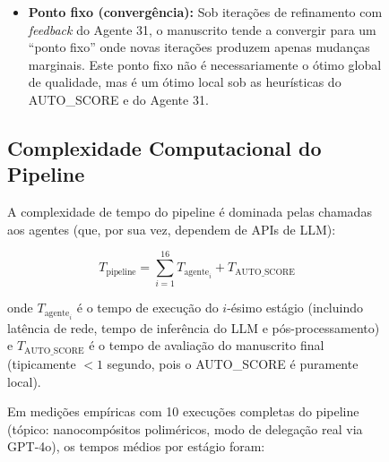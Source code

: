 \begin{figure}
\begin{itemize}
    \item \textbf{Ponto fixo (convergência):} Sob iterações de
    refinamento com \textit{feedback} do Agente 31, o manuscrito
    tende a convergir para um ``ponto fixo'' onde novas iterações
    produzem apenas mudanças marginais. Este ponto fixo não é
    necessariamente o ótimo global de qualidade, mas é um ótimo
    local sob as heurísticas do AUTO\_SCORE e do Agente 31.
\end{itemize}

\subsection{Complexidade Computacional do Pipeline}
\label{sec:complexidade}

A complexidade de tempo do pipeline é dominada pelas chamadas aos
agentes (que, por sua vez, dependem de APIs de LLM):

\begin{equation}
T_{\text{pipeline}} = \sum_{i=1}^{16} T_{\text{agente}_i} + T_{\text{AUTO\_SCORE}}
\label{eq:tempo}
\end{equation}

onde $T_{\text{agente}_i}$ é o tempo de execução do $i$-ésimo
estágio (incluindo latência de rede, tempo de inferência do LLM e
pós-processamento) e $T_{\text{AUTO\_SCORE}}$ é o tempo de
avaliação do manuscrito final (tipicamente $< 1$ segundo, pois o
AUTO\_SCORE é puramente local).

Em medições empíricas com 10 execuções completas do pipeline
(tópico: nanocompósitos poliméricos, modo de delegação real via
GPT-4o), os tempos médios por estágio foram:


\end{figure}
